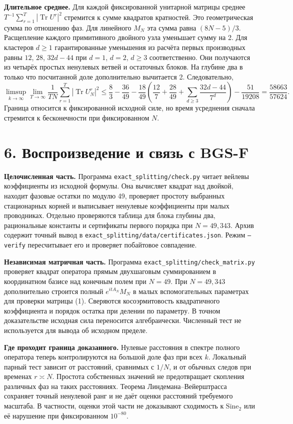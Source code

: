 \documentclass[11pt,a4paper]{article}
\newcommand{\Tr}{\operatorname{Tr}}
\newcommand{\si}{\mathrm{Sine}_2}
\newcommand{\sect}[1]{\section*{\sffamily\color{ink}#1}}
\newcommand{\subt}[1]{\par\medskip\noindent\textbf{#1.}\quad}
\begin{document}
\subt{Длительное среднее}
Для каждой фиксированной унитарной матрицы среднее \(T^{-1}\sum_{r=1}^T|\Tr U^r|^2\) стремится к сумме квадратов кратностей. Это геометрическая сумма по отношению фаз. Для линейного \(M_N\) эта сумма равна \((8N-5)/3\). Расщепление каждого примитивного двойного узла уменьшает сумму на 2. Для кластеров \(d\ge1\) гарантированные уменьшения из расчёта первых производных равны \(12\), \(28\), \(32d-44\) при \(d=1\), \(d=2\), \(d\ge3\) соответственно. Они получаются из четырёх простых ненулевых ветвей и остаточных блоков. На глубине два в только что посчитанной доле дополнительно вычитается 2. Следовательно,
\[
 \limsup_{k\to\infty}\lim_{T\to\infty}
 \frac1{T N}\sum_{r=1}^T|\Tr U_N^r|^2
 \le\frac83-\frac{36}{49}
   -\frac{18}{49}\left(\frac{12}7+\frac{28}{49}
                +\sum_{d\ge3}\frac{32d-44}{7^d}\right)
   -\frac{51}{19208}
 =\frac{58663}{57624}.
\]
Граница относится к фиксированной исходной силе, но время усреднения сначала стремится к бесконечности при фиксированном \(N\).

\newpage
\sect{6. Воспроизведение и связь с BGS-F}
\subt{Целочисленная часть}
Программа \texttt{exact\_splitting/check.py} читает вейлевы коэффициенты из исходной формулы. Она вычисляет квадрат над двойкой, находит фазовые остатки по модулю 49, проверяет простоту выбранных стационарных корней и выписывает ненулевые коэффициенты при малых проводниках. Отдельно проверяются таблица для блока глубины два, рациональные константы и сертификаты первого порядка при \(N=49,343\). Архив содержит точный вывод в \texttt{exact\_splitting/data/certificates.json}. Режим \texttt{--verify} пересчитывает его и проверяет побайтовое совпадение.

\subt{Независимая матричная часть}
Программа \texttt{exact\_splitting/check\_matrix.py} проверяет квадрат оператора прямым двухшаговым суммированием в координатном базисе над конечным полем при \(N=49\). При \(N=49,343\) дополнительно строится полный \(e^{itA_N}M_N\) в малых вспомогательных параметрах для проверки матрицы (1). Сверяются косоэрмитовость квадратичного коэффициента и порядок остатка при делении по параметру. В точном доказательстве исходная сила переносится алгебраически. Численный тест не используется для вывода об исходном пределе.

\subt{Где проходит граница доказанного}
Нулевые расстояния в спектре полного оператора теперь контролируются на большой доле фаз при всех \(k\). Локальный парный тест зависит от расстояний, сравнимых с \(1/N\), и от обычных следов при временах \(r\asymp N\). Простота собственных значений не предотвращает скопления различных фаз на таких расстояниях. Теорема Линдемана--Вейерштрасса сохраняет точный ненулевой ранг и не даёт оценки расстояний требуемого масштаба. В частности, оценки этой части не доказывают сходимость к \(\si\) или её нарушение при фиксированном \(10^{-80}\).
\end{document}

